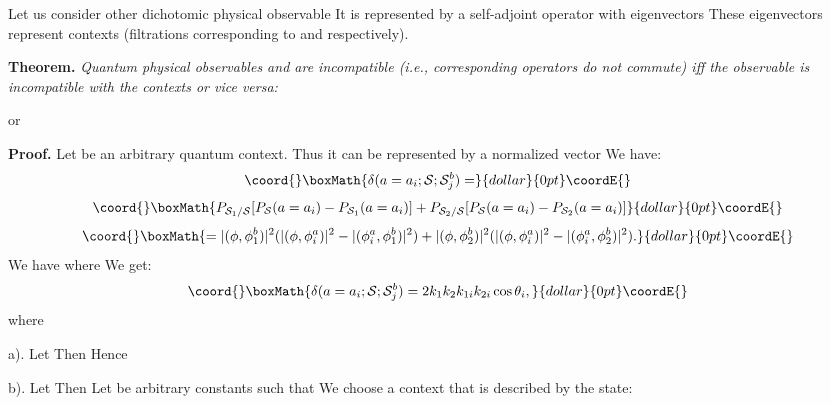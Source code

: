 \documentclass[12pt,oneside,final,a4paper]{article}
\begin{document}
Let us consider other dichotomic physical observable \coordHE{} It is represented
by a self-adjoint operator \coordHE{} with eigenvectors \coordHE{} 
These eigenvectors represent contexts \coordHE{} 
(filtrations corresponding to \coordHE{} and \coordHE{} respectively).

{\bf Theorem.} {\it Quantum physical observables \coordHE{} and \coordHE{} are incompatible
(i.e., corresponding operators do not commute) iff the observable \coordHE{} is incompatible
with the contexts \coordHE{} or vice versa:}

\coordHE{} or \coordHE{}

{\bf Proof.} Let \coordHE{} be an arbitrary quantum context. Thus it can be represented
by a normalized vector \coordHE{} We have:
$$\coord{}\boxMath{
\delta(a=a_i; {\cal S}; {\cal S}_j^b)=
}{dollar}{0pt}\coordE{}$$  $$\coord{}\boxMath{
P_{{\cal S}_1/{\cal S}} [P_{{\cal S}}(a=a_i)-
P_{{\cal S}_1}(a=a_i)]+ P_{{\cal S}_2/{\cal S}} [P_{{\cal S}}(a=a_i)-
P_{{\cal S}_2}(a=a_i)]
 }{dollar}{0pt}\coordE{}$$
 $$\coord{}\boxMath{
 = \vert (\phi, \phi_1^b)\vert^2( \vert (\phi, \phi_i^a)\vert^2 - \vert (\phi_i^a, \phi_1^b)\vert^2)
 + \vert (\phi, \phi_2^b)\vert^2( \vert (\phi, \phi_i^a)\vert^2 - \vert (\phi_i^a, \phi_2^b)\vert^2).
 }{dollar}{0pt}\coordE{}$$
 We have \coordHE{}
 where \coordHE{} We get:
$$\coord{}\boxMath{
\delta(a=a_i; {\cal S}; {\cal S}_j^b)= 2 k_1 k_2 k_{1i} k_{2i} \cos \theta_i,
}{dollar}{0pt}\coordE{}$$
where \coordHE{}

a). Let \coordHE{} Then \coordHE{}  Hence
\coordHE{}

b). Let \coordHE{} Then \coordHE{}
Let \coordHE{} be arbitrary constants such that 
\coordHE{} We choose a context \coordHE{} that is described
by the state:
\end{document}
